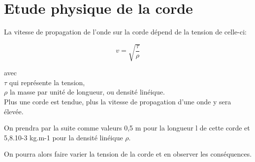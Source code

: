 \section{Etude physique de la corde}

La vitesse de propagation de l'onde sur la corde dépend de la tension de celle-ci:

\begin{equation*}
v = \sqrt{\frac{\tau}{\rho}}
\end{equation*}

avec \\
\hspace*{2cm} $\tau$ qui représente la tension, \\
\hspace*{2cm} $\rho$ la masse par unité de longueur, ou densité linéique.\\

Plus une corde est tendue, plus la vitesse de propagation d’une onde y sera élevée.\

On prendra par la suite comme valeurs 0,5 m pour la longueur l de cette corde et 5,8.10-3 kg.m-1 pour la densité linéique $\rho$.\

On pourra alors faire varier la tension de la corde et en observer les conséquences.


